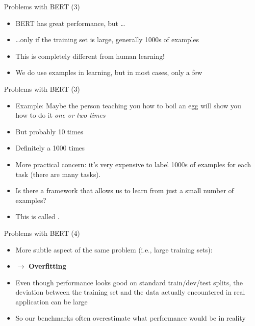 \begin{frame}{Problems with BERT (3)}

\vfill

  \begin{itemize}
\item BERT has great performance, but \ldots
\item \ldots only if the training set is large, generally 1000s of examples
\item This is completely different from human learning!
\item We do use examples in learning, but in most cases, only a few
\end{itemize}

\vfill

\end{frame}


\begin{frame}{Problems with BERT (3)}

\vfill

  \begin{itemize}
\item Example: Maybe the person teaching you how to boil an egg will show you how to do it \textit{one or two times}
\item But probably  10 times
\item Definitely  a 1000 times 
\item More practical concern: it's very expensive to label 1000s of examples for each task (there are many tasks).
\item \ques Is there a framework that allows us to learn from just a small number of examples?
\item This is called .
    \end{itemize}

\vfill

\end{frame}


\begin{frame}{Problems with BERT (4)}

\vfill

  \begin{itemize}
		\item More subtle aspect of the same problem (i.e., large training sets):
		\item[] $\to$ \textbf{Overfitting}
		\item Even though performance looks good on standard train/dev/test splits, the deviation between the training set and the
data actually encountered in real application can be large
		\item So our benchmarks often overestimate what performance would be in reality
  \end{itemize}

\vfill

\end{frame}

